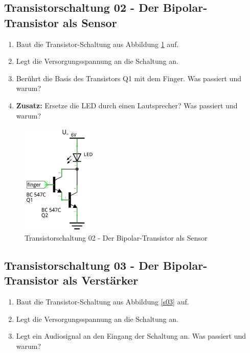 
\subsection*{Transistorschaltung 02 - Der Bipolar-Transistor als Sensor}

\begin{enumerate}
    \itemsep1pt\parskip0pt
    \item Baut die Transistor-Schaltung aus Abbildung \ref{s02} auf.
    \item Legt die Versorgungsspannung an die Schaltung an.
    \item Berührt die Basis des Transistors Q1 mit dem Finger. Was passiert und warum?
    \item \textbf{Zusatz:} Ersetze die LED durch einen Lautsprecher? Was passiert und warum?
\end{enumerate}

\begin{figure}[H]
	\centering
	\includegraphics[scale=1.6]{Transistor/Schaltungen/NPN_Sensor.pdf}
	\caption{Transistorschaltung 02 - Der Bipolar-Transistor als Sensor}
	\label{s02}
\end{figure}


\subsection*{Transistorschaltung 03 - Der Bipolar-Transistor als Verstärker}

\begin{enumerate}
    \itemsep1pt\parskip0pt
    \item Baut die Transistor-Schaltung aus Abbildung \ref{s03} auf.
    \item Legt die Versorgungsspannung an die Schaltung an.
    \item Legt ein Audiosignal an den Eingang der Schaltung an. Was passiert und warum?
\end{enumerate}

